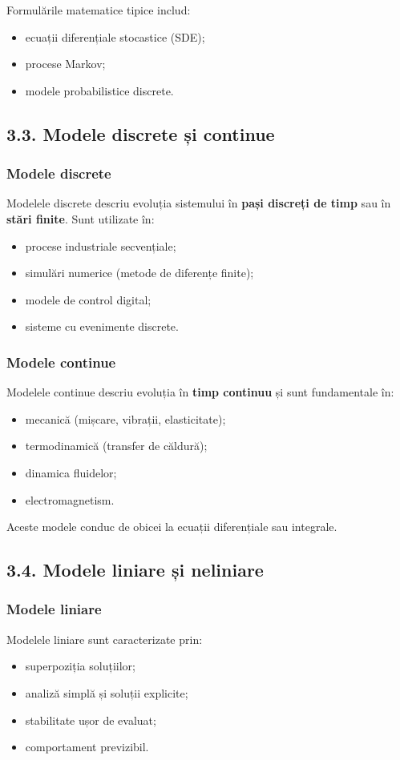 \documentclass[12pt,a4paper]{article}
\begin{document}
Formulările matematice tipice includ:
\begin{itemize}
    \item ecuații diferențiale stocastice (SDE);
    \item procese Markov;
    \item modele probabilistice discrete.
\end{itemize}

\subsection{3.3. Modele discrete și continue}

\subsubsection*{Modele discrete}
Modelele discrete descriu evoluția sistemului în \textbf{pași discreți de timp} sau în \textbf{stări finite}. Sunt utilizate în:
\begin{itemize}
    \item procese industriale secvențiale;
    \item simulări numerice (metode de diferențe finite);
    \item modele de control digital;
    \item sisteme cu evenimente discrete.
\end{itemize}

\subsubsection*{Modele continue}
Modelele continue descriu evoluția în \textbf{timp continuu} și sunt fundamentale în:
\begin{itemize}
    \item mecanică (mișcare, vibrații, elasticitate);
    \item termodinamică (transfer de căldură);
    \item dinamica fluidelor;
    \item electromagnetism.
\end{itemize}

Aceste modele conduc de obicei la ecuații diferențiale sau integrale.

\subsection{3.4. Modele liniare și neliniare}

\subsubsection*{Modele liniare}
Modelele liniare sunt caracterizate prin:
\begin{itemize}
    \item superpoziția soluțiilor;
    \item analiză simplă și soluții explicite;
    \item stabilitate ușor de evaluat;
    \item comportament previzibil.
\end{itemize}
\end{document}
